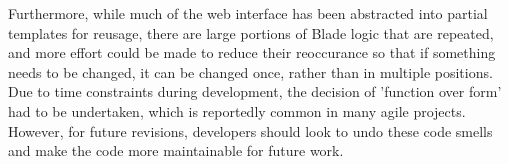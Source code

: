 Furthermore, while much of the web interface has been abstracted into partial templates for reusage, there are large portions of Blade logic that are repeated, and more effort could be made to reduce their reoccurance so that if something needs to be changed, it can be changed once, rather than in multiple positions. Due to time constraints during development, the decision of 'function over form' had to be undertaken, which is reportedly common in many agile projects. However, for future revisions, developers should look to undo these code smells and make the code more maintainable for future work.